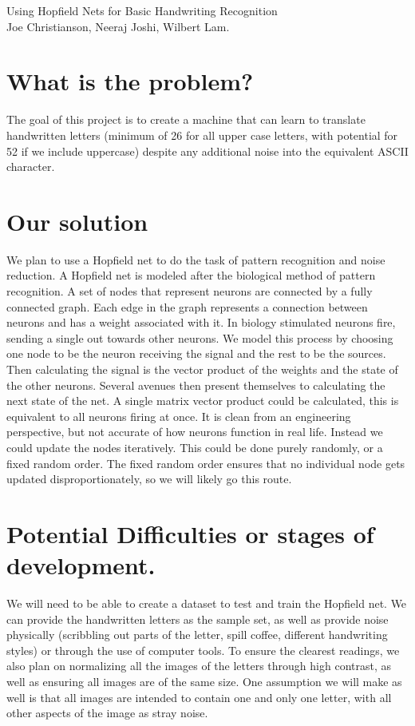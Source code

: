 \documentclass[11pt,reqno]{article}
\begin{document}
\begin{center}
\Large Using Hopfield Nets for Basic Handwriting Recognition \\
Joe Christianson, Neeraj Joshi, Wilbert Lam.
\end{center}
\section{What is the problem?}
The goal of this project is to create a machine that can learn to translate handwritten letters (minimum of 26 for all upper case letters, with potential for 52 if we include uppercase) despite any additional noise into the equivalent ASCII character.
\section{Our solution}
We plan to use a Hopfield net to do the task of pattern recognition and noise reduction. A Hopfield net is modeled after the biological method of pattern recognition. A set of nodes that represent neurons are connected by a fully connected graph. Each edge in the graph represents a connection between neurons and has a weight associated with it. In biology stimulated neurons fire, sending a single out towards other neurons. We model this process by choosing one node to be the neuron receiving the signal and the rest to be the sources. Then calculating the signal is the vector product of the weights and the state of the other neurons. Several avenues then present themselves to calculating the next state of the net. A single matrix vector product could be calculated, this is equivalent to all neurons firing at once. It is clean from an engineering perspective, but not accurate of how neurons function in real life. Instead we could update the nodes iteratively. This could be done purely randomly, or a fixed random order. The fixed random order ensures that no individual node gets updated disproportionately, so we will likely go this route. 
\section{Potential Difficulties or stages of development.} 
We will need to be able to create a dataset to test and train the Hopfield net.  We can provide the handwritten letters as the sample set, as well as provide noise physically (scribbling out parts of the letter, spill coffee, different handwriting styles) or through the use of computer tools.  To ensure the clearest readings, we also plan on normalizing all the images of the letters through high contrast, as well as ensuring all images are of the same size.  One assumption we will make as well is that all images are intended to contain one and only one letter, with all other aspects of the image as stray noise.
    
\end{document}
